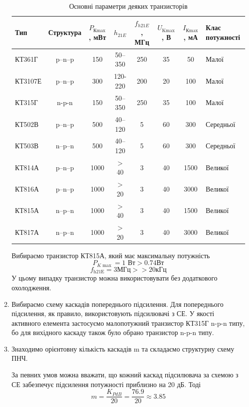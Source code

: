 \documentclass[main.tex]{subfiles}
\begin{document}
\begin{enumerate}
\begin{table}[H]
\centering
\caption{Основні параметри деяких транзисторів}
\label{tab:5.2}
\footnotesize
\begin{tabular}{|l|c|c|c|c|c|c|l|}
\hline
\textbf{Тип} & \textbf{Структура} & \textbf{$P_{\text{К}\max}$, мВт} & \textbf{$h_{21E}$} & \textbf{$f_{h21E}$, МГц} & \textbf{$U_{\text{K}\max}$, В} & \textbf{$I_{\text{К}\max}$, мА} & \textbf{Клас потужності} \\ 
\hline
КТ361Г   & p–n–p & 150  & 50–350   & 250 & 35 & 50   & Малої      \\ 
КТ3107Е  & p–n–p & 300  & 120-220  & 200 & 20 & 100  & Малої      \\ 
КТ315Г   & n-p-n & 150  & 50–350   & 250 & 35 & 100  & Малої      \\ 
\hline
КТ502В   & p–n–p & 500  & 40–120   & 5   & 60 & 300  & Середньої  \\ 
КТ503В   & n–p–n & 500  & 40–120   & 5   & 60 & 300  & Середньої  \\ 
\hline
КТ814А   & p–n–p & 1000 & $>$40    & 3   & 40 & 1500 & Великої    \\ 
КТ816А   & p–n–p & 1000 & $>$20    & 3   & 40 & 3000 & Великої    \\ 
КТ815А   & n–p–n & 1000 & $>$40    & 3   & 40 & 1500 & Великої    \\ 
КТ817А   & n–p–n & 1000 & $>$20    & 3   & 40 & 3000 & Великої    \\ 
\hline
\end{tabular}
\normalsize
\end{table}

Вибираємо транзистор КТ815А, який має максимальну потужність
\[ P_{K\max} = 1 \text{ Вт} > 0.74 \text{Вт} \] \[f_\text{h21E} = 3 \text{МГц} >> 20 \text{кГц} \]
У цьому випадку транзистор можна використовувати без додаткового охолодження.

\item Вибираємо схему каскадів попереднього підсилення.
Для попереднього підсилення, як правило, використовують підсилювачі з
СЕ.
У якості активного елемента застосуємо малопотужний транзистор КТ315Г \cite{boyko_electronics}
n-p-n типу, бо для вихідного каскаду також було обрано транзистор n-p-n типу.

\item Знаходимо орієнтовну кількість каскадів m та складаємо структурну
схему ПНЧ.

За певних умов можна вважати, що кожний каскад підсилювача за схемою з
СЕ забезпечує підсилення потужності приблизно на 20 дБ. Тоді
\[
m = \frac{K_{PdB}}{20} = \frac{76.9}{20} \approx 3.85
\]


\end{enumerate}
\end{document}
